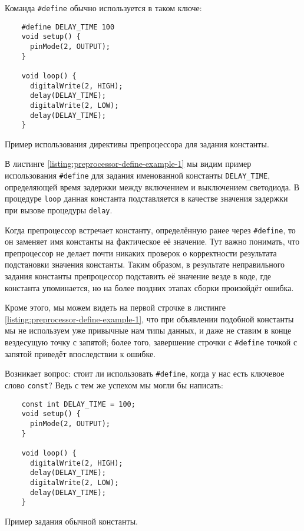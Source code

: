 \documentclass[../sparc.tex]{subfiles}
\begin{document}
Команда \texttt{#define} обычно используется в таком ключе:

\begin{listing}[H]
  \begin{verbatim}
    #define DELAY_TIME 100
    void setup() {
      pinMode(2, OUTPUT);
    }

    void loop() {
      digitalWrite(2, HIGH);
      delay(DELAY_TIME);
      digitalWrite(2, LOW);
      delay(DELAY_TIME);
    }
  \end{verbatim}
  \label{listing:preprocessor-define-example-1}
  \caption{Пример использования директивы препроцессора для задания константы.}
\end{listing}

В листинге \ref{listing:preprocessor-define-example-1} мы видим пример
использования \texttt{#define} для задания именованной константы
\texttt{DELAY_TIME}, определяющей время задержки между включением и
выключением светодиода.  В процедуре \texttt{loop} данная константа
подставляется в качестве значения задержки при вызове процедуры
\texttt{delay}.

Когда препроцессор встречает константу, определённую ранее через
\texttt{#define}, то он заменяет имя константы на фактическое её
значение.  Тут важно понимать, что препроцессор не делает почти никаких проверок
о корректности результата подстановки значения константы.  Таким образом, в
результате неправильного задания константы препроцессор подставить её значение
везде в коде, где константа упоминается, но на более поздних этапах сборки
произойдёт ошибка.

Кроме этого, мы можем видеть на первой строчке в листинге
\ref{listing:preprocessor-define-example-1}, что при объявлении подобной константы
мы не используем уже привычные нам типы данных, и даже не ставим в конце
вездесущую точку с запятой; более того, завершение строчки с
\texttt{#define} точкой с запятой приведёт впоследствии к ошибке.

Возникает вопрос: стоит ли использовать \texttt{#define}, когда у нас
есть ключевое слово \texttt{const}?  Ведь с тем же успехом мы могли бы
написать:

\begin{listing}[H]
  \begin{verbatim}
    const int DELAY_TIME = 100;
    void setup() {
      pinMode(2, OUTPUT);
    }

    void loop() {
      digitalWrite(2, HIGH);
      delay(DELAY_TIME);
      digitalWrite(2, LOW);
      delay(DELAY_TIME);
    }
  \end{verbatim}
  \label{listing:preprocessor-define-example-2}
  \caption{Пример задания обычной константы.}
\end{listing}
\end{document}

